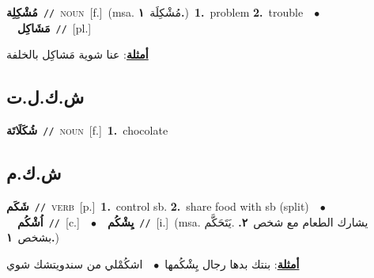 \documentclass[10pt,a4paper,twoside]{article} %
\begin{document}
\begin{multicols}{2}
{\setlength\topsep{0pt}\textbf{\foreignlanguage{arabic}{مُشْكِلِة}}\ {\color{gray}\texttt{//}\color{black}}\ \textsc{noun}\ [f.]\ \color{gray}(msa. \foreignlanguage{arabic}{مُشْكِلَة}~\foreignlanguage{arabic}{\textbf{١.}})\color{black}\ \textbf{1.}~problem  \textbf{2.}~trouble\ \ $\bullet$\ \ \setlength\topsep{0pt}\textbf{\foreignlanguage{arabic}{مَشَاكِل}}\ {\color{gray}\texttt{//}\color{black}}\ [pl.]\  \begin{flushright}\color{gray}\foreignlanguage{arabic}{\textbf{\underline{\foreignlanguage{arabic}{أمثلة}}}: عنا شوية مَشاكِل بالخلفة}\end{flushright}\color{black}} \vspace{2mm}

\vspace{-3mm}
\subsection*{\color{blue}\foreignlanguage{arabic}{ش.ك.ل.ت}\color{blue}{ (ntws)}} 

{\setlength\topsep{0pt}\textbf{\foreignlanguage{arabic}{شُكَلَاتَة}}\ {\color{gray}\texttt{//}\color{black}}\ \textsc{noun}\ [f.]\ \textbf{1.}~chocolate\ } \vspace{2mm}

\vspace{-3mm}
\subsection*{\color{blue}\foreignlanguage{arabic}{ش.ك.م}\color{blue}{}} 

{\setlength\topsep{0pt}\textbf{\foreignlanguage{arabic}{شَكَم}}\ {\color{gray}\texttt{//}\color{black}}\ \textsc{verb}\ [p.]\ \textbf{1.}~control sb.  \textbf{2.}~share food with sb (split)\ \ $\bullet$\ \ \setlength\topsep{0pt}\textbf{\foreignlanguage{arabic}{اُشْكُم}}\ {\color{gray}\texttt{//}\color{black}}\ [c.]\ \ $\bullet$\ \ \setlength\topsep{0pt}\textbf{\foreignlanguage{arabic}{يِشْكُم}}\ {\color{gray}\texttt{//}\color{black}}\ [i.]\ \color{gray}(msa. \foreignlanguage{arabic}{يشارك الطعام مع شخص}~\foreignlanguage{arabic}{\textbf{٢.}}  .\foreignlanguage{arabic}{يَتَحَكَّم بشخص}~\foreignlanguage{arabic}{\textbf{١.}})\color{black}\  \begin{flushright}\color{gray}\foreignlanguage{arabic}{\textbf{\underline{\foreignlanguage{arabic}{أمثلة}}}: بنتك بدها رجال يِشْكُمها\ $\bullet$\ \  اشكُمْلي من سندويتشك شوي}\end{flushright}\color{black}} \vspace{2mm}


\end{multicols}
\end{document}
